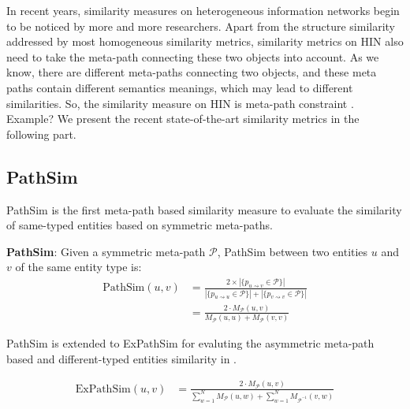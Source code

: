 \documentclass{acm_proc_article-csis8101}
\begin{document}
In recent years, similarity measures on heterogeneous information networks begin to be noticed by more and more researchers. Apart from the structure similarity addressed by most homogeneous similarity metrics, similarity metrics on HIN also need to take the meta-path connecting these two objects into account. As we know, there are different meta-paths connecting two objects, and these meta paths contain different semantics meanings, which may lead to different similarities. So, the similarity measure on HIN is meta-path constraint \cite{shi2017survey}. {\color{red} Example?} We present the recent state-of-the-art similarity metrics in the following part.

\subsection{PathSim}

PathSim \cite{sun2011pathsim} is the first meta-path based similarity measure to evaluate the similarity of same-typed entities based on symmetric meta-paths.

\begin{definition}
{\bf PathSim}: Given a symmetric meta-path $\mathcal{P}$, PathSim between two entities $u$ and $v$ of the same entity type is:
\begin{equation}
\begin{split}
\text{PathSim}(u, v) & = \frac{2 \times |\{p_{u\rightsquigarrow v}\in \mathcal{P}\}|}{|\{p_{u\rightsquigarrow u}\in \mathcal{P}\}| + |\{p_{v\rightsquigarrow v}\in \mathcal{P}\}|} \\
 & =\frac{2 \cdot M_{\mathcal{P}}(u, v)}{M_{\mathcal{P}}(u, u) + M_{\mathcal{P}}(v, v)}
\end{split}
\end{equation}
\end{definition}

PathSim is extended to ExPathSim for evaluting the asymmetric meta-path based and different-typed entities similarity in \cite{zhu2017measuring}. 

\begin{definition}
\begin{equation}
\begin{split}
\text{ExPathSim}(u, v) & =\frac{2 \cdot M_{\mathcal{P}}(u, v)}{\sum_{w=1}^{N}M_{\mathcal{P}}(u, w) + \sum_{w=1}^{N}M_{\mathcal{P}^{-1}}(v, w)}
\end{split}
\end{equation}
\end{definition}
\end{document}
